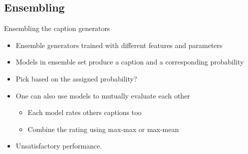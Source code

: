 \documentclass{beamer}
\begin{document}
\subsection{Ensembling}
\begin{frame}{Ensembling the caption generators}
\begin{itemize}
    \item Ensemble generators trained with different features and parameters
    \item Models in ensemble set produce a caption and a corresponding probability 
    \item Pick based on the assigned probability? 
    \item One can also use models to mutually evaluate each other 
       \begin{itemize}
           \item Each model rates others captions too
           \item Combine the rating using max-max or max-mean 
       \end{itemize}
    \item Unsatisfactory performance. 
\end{itemize}
\end{frame}
\end{document}
